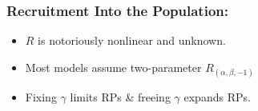 \documentclass[a0paper,portrait]{baposter}
\begin{document}
\begin{poster}
{\begin{minipage}[h!]{0.55\textwidth}
	\subsubsection*{Recruitment Into the Population:}
        \begin{minipage}[b]{0.5\textwidth}
	\begin{itemize}[leftmargin=*]
		\raggedright	
		\item $R$ is notoriously nonlinear and unknown.%
		\item Most models assume two-parameter $R_{(\alpha, \beta, -1)}$ 
		\item Fixing $\gamma$ limits RPs \& freeing $\gamma$ expands RPs.	
	\end{itemize}
	$~$\\$~$\\$~$\\$~$\\
	\end{minipage}
	\begin{minipage}[b]{0.48\textwidth}
		$~$\\

\end{minipage}
\end{minipage}}
\end{poster}
\end{document}
